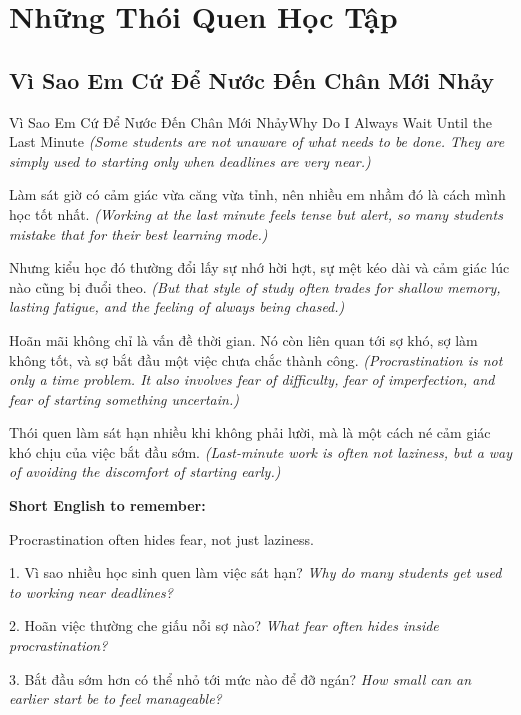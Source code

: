 \chapter{Những Thói Quen Học Tập}

\section{Vì Sao Em Cứ Để Nước Đến Chân Mới Nhảy}
\begin{truyen}{Vì Sao Em Cứ Để Nước Đến Chân Mới Nhảy}{Why Do I Always Wait Until the Last Minute}
\textit{(Some students are not unaware of what needs to be done. They are simply used to starting only when deadlines are very near.)}

Làm sát giờ có cảm giác vừa căng vừa tỉnh, nên nhiều em nhầm đó là cách mình học tốt nhất.
\textit{(Working at the last minute feels tense but alert, so many students mistake that for their best learning mode.)}

Nhưng kiểu học đó thường đổi lấy sự nhớ hời hợt, sự mệt kéo dài và cảm giác lúc nào cũng bị đuổi theo.
\textit{(But that style of study often trades for shallow memory, lasting fatigue, and the feeling of always being chased.)}

Hoãn mãi không chỉ là vấn đề thời gian. Nó còn liên quan tới sợ khó, sợ làm không tốt, và sợ bắt đầu một việc chưa chắc thành công.
\textit{(Procrastination is not only a time problem. It also involves fear of difficulty, fear of imperfection, and fear of starting something uncertain.)}
\end{truyen}

\begin{baihoc}
Thói quen làm sát hạn nhiều khi không phải lười, mà là một cách né cảm giác khó chịu của việc bắt đầu sớm.
\textit{(Last-minute work is often not laziness, but a way of avoiding the discomfort of starting early.)}
\end{baihoc}

\begin{ghinhoanh}
\textbf{Short English to remember:}

Procrastination often hides fear, not just laziness.

\end{ghinhoanh}

\begin{tuhocnhanh}
1. Vì sao nhiều học sinh quen làm việc sát hạn? \textit{Why do many students get used to working near deadlines?}

2. Hoãn việc thường che giấu nỗi sợ nào? \textit{What fear often hides inside procrastination?}

3. Bắt đầu sớm hơn có thể nhỏ tới mức nào để đỡ ngán? \textit{How small can an earlier start be to feel manageable?}
\end{tuhocnhanh}
\ngancach

